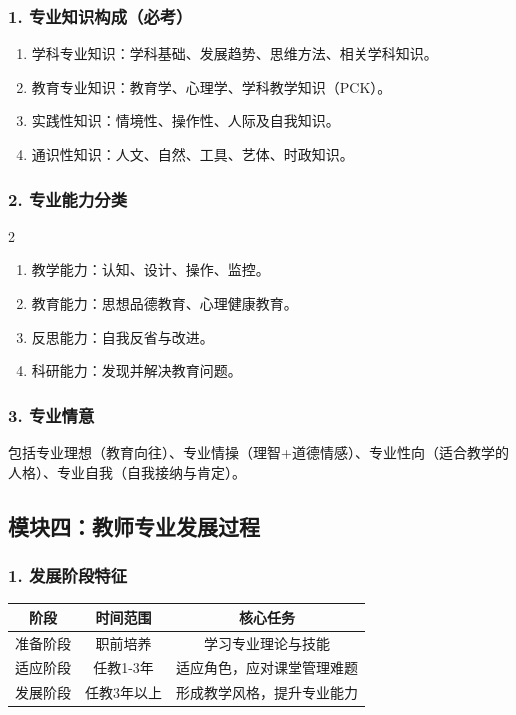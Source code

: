 \documentclass[12pt,a4paper]{article}
\begin{document}
\subsubsection{1. 专业知识构成（必考）}
\begin{enumerate}[label=•,itemsep=0.5ex]
\item 学科专业知识：学科基础、发展趋势、思维方法、相关学科知识。
\item 教育专业知识：教育学、心理学、学科教学知识（PCK）。
\item 实践性知识：情境性、操作性、人际及自我知识。
\item 通识性知识：人文、自然、工具、艺体、时政知识。
\end{enumerate}

\subsubsection{2. 专业能力分类}
\begin{multicols}{2}
\begin{enumerate}[label=•,itemsep=0.5ex]
\item 教学能力：认知、设计、操作、监控。
\item 教育能力：思想品德教育、心理健康教育。
\item 反思能力：自我反省与改进。
\item 科研能力：发现并解决教育问题。
\end{enumerate}
\end{multicols}

\subsubsection{3. 专业情意}
包括专业理想（教育向往）、专业情操（理智+道德情感）、专业性向（适合教学的人格）、专业自我（自我接纳与肯定）。

\subsection{模块四：教师专业发展过程}
\subsubsection{1. 发展阶段特征}
\begin{center}
\begin{tabular}{|c|c|c|}
\hline
\textbf{阶段} & \textbf{时间范围} & \textbf{核心任务} \\
\hline
准备阶段 & 职前培养 & 学习专业理论与技能 \\
\hline
适应阶段 & 任教1-3年 & 适应角色，应对课堂管理难题 \\
\hline
发展阶段 & 任教3年以上 & 形成教学风格，提升专业能力 \\
\hline
\end{tabular}
\end{center}
\end{document}
